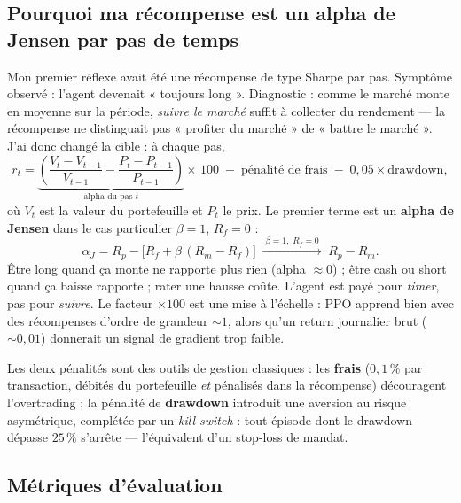 \documentclass[11pt,a4paper]{article}
\begin{document}
\subsection{Pourquoi ma récompense est un alpha de Jensen par pas de temps}

Mon premier réflexe avait été une récompense de type Sharpe par pas. Symptôme observé :
l'agent devenait « toujours long ». Diagnostic : comme le marché monte en moyenne sur la
période, \emph{suivre le marché} suffit à collecter du rendement --- la récompense ne
distinguait pas « profiter du marché » de « battre le marché ». J'ai donc changé la
cible : à chaque pas,
\[
r_t = \underbrace{\left(\frac{V_t - V_{t-1}}{V_{t-1}} - \frac{P_t - P_{t-1}}{P_{t-1}}\right)}_{\text{alpha du pas } t}
\times\, 100
\;-\; \text{pénalité de frais} \;-\; 0{,}05 \times \text{drawdown},
\]
où $V_t$ est la valeur du portefeuille et $P_t$ le prix. Le premier terme est un
\textbf{alpha de Jensen} dans le cas particulier $\beta = 1$, $R_f = 0$ :
\[
\alpha_J = R_p - \big[R_f + \beta\,(R_m - R_f)\big] \;\xrightarrow{\;\beta=1,\; R_f=0\;}\; R_p - R_m .
\]
Être long quand ça monte ne rapporte plus rien (alpha $\approx 0$) ; être cash ou short
quand ça baisse rapporte ; rater une hausse coûte. L'agent est payé pour \emph{timer},
pas pour \emph{suivre}. Le facteur $\times 100$ est une mise à l'échelle : PPO apprend
bien avec des récompenses d'ordre de grandeur $\sim 1$, alors qu'un return journalier
brut ($\sim 0{,}01$) donnerait un signal de gradient trop faible.

Les deux pénalités sont des outils de gestion classiques : les \textbf{frais}
($0{,}1\,\%$ par transaction, débités du portefeuille \emph{et} pénalisés dans la
récompense) découragent l'overtrading ; la pénalité de \textbf{drawdown} introduit une
aversion au risque asymétrique, complétée par un \emph{kill-switch} : tout épisode dont
le drawdown dépasse $25\,\%$ s'arrête --- l'équivalent d'un stop-loss de mandat.

\subsection{Métriques d'évaluation}
\end{document}
